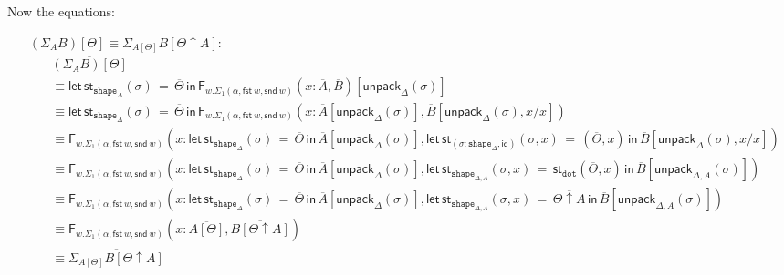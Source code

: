 \documentclass[10pt]{article}
\theoremstyle{definition}
\newcommand\dsd[1]{\ensuremath{\mathsf{#1}}}
\newcommand{\app}[2]{\ensuremath{#1 \: #2}}
\newcommand{\fst}[1]{\app{\dsd{fst}}{#1}}
\newcommand{\snd}[1]{\app{\dsd{snd}}{#1}}
\newcommand{\id}{\mathsf{id}}
\newcommand\F[2]{\ensuremath{\mathsf{F}_{#1}(#2)}}
\newcommand\StI[2]{\ensuremath{\mathsf{st}_{#1}(#2)}}
\newcommand\StE[4]{\ensuremath{\mathsf{let} \, \StI{#1}{#3} \, = \, {#2} \, \mathsf{in} \, #4}}
\newcommand\unpack[2]{\ensuremath{\mathsf{unpack}_{#1}(#2)}}
\newcommand{\tdot}{\ensuremath{\mathtt{dot}}}
\newcommand{\tshape}[1]{\ensuremath{\mathtt{shape}_{#1}}}
\newcommand{\upstairs}[1]{\overline{#1}}
\begin{document}
Now the equations:
\begin{enumerate}[style = multiline, labelwidth = 80pt]
\item[{$(\Sigma_A B)[\Theta] \equiv \Sigma_{A[\Theta]} B[\Theta \uparrow A]$}:] 
\begin{align*}
&\upstairs{(\Sigma_A B)[\Theta]} \\
&\equiv \StE{\tshape{\Delta}}{\upstairs{\Theta}}{\sigma}{\F{w. \Sigma_1(\alpha,\fst w, \snd w)}{x : \upstairs{A}, \upstairs{B}}[\unpack{\Delta}{\sigma}]} \\
&\equiv \StE{\tshape{\Delta}}{\upstairs{\Theta}}{\sigma}{\F{w. \Sigma_1(\alpha,\fst w, \snd w)}{x : \upstairs{A}[\unpack{\Delta}{\sigma}], \upstairs{B}[\unpack{\Delta}{\sigma}, x / x] }} \\
&\equiv \F{w. \Sigma_1(\alpha,\fst w, \snd w)}{x : \StE{\tshape{\Delta}}{\upstairs{\Theta}}{\sigma}{\upstairs{A}[\unpack{\Delta}{\sigma}]}, \StE{(\sigma : \tshape{\Delta}, \id)}{(\upstairs{\Theta},x)}{\sigma, x}{\upstairs{B}[\unpack{\Delta}{\sigma}, x/x]} } \\
&\equiv \F{w. \Sigma_1(\alpha,\fst w, \snd w)}{x : \StE{\tshape{\Delta}}{\upstairs{\Theta}}{\sigma}{\upstairs{A}[\unpack{\Delta}{\sigma}]}, \StE{\tshape{\Delta, A}}{\StI{\tdot}{\upstairs{\Theta},x}}{\sigma, x}{\upstairs{B}[\unpack{\Delta, A}{\sigma}]} } \\
&\equiv \F{w. \Sigma_1(\alpha,\fst w, \snd w)}{x : \StE{\tshape{\Delta}}{\upstairs{\Theta}}{\sigma}{\upstairs{A}[\unpack{\Delta}{\sigma}]}, \StE{\tshape{\Delta, A}}{\upstairs{\Theta \uparrow A}}{\sigma, x}{\upstairs{B}[\unpack{\Delta, A}{\sigma}]} } \\
&\equiv \F{w. \Sigma_1(\alpha,\fst w, \snd w)}{x : \upstairs{A[\Theta]}, \upstairs{B[\Theta \uparrow A]}} \\
&\equiv \upstairs{\Sigma_{A[\Theta]} B[\Theta \uparrow A]}
\end{align*}


\end{enumerate}
\end{document}
